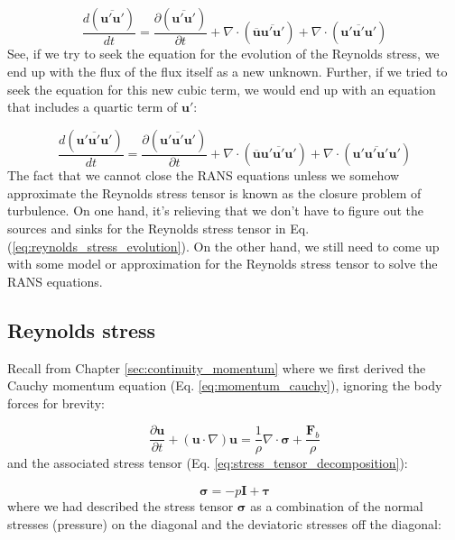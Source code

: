 \documentclass[12pt]{article}
\numberwithin{equation}{section}
\numberwithin{figure}{section}
\numberwithin{table}{section}
\begin{document}
\begin{equation}
  \frac{d \left( \overline{\mathbf{u}' \mathbf{u}'} \right)}{dt} =
  \frac{\partial \left( \overline{\mathbf{u}' \mathbf{u}'} \right)}{\partial t} +
  \nabla \cdot \left( \overline{\mathbf{u}} \overline{\mathbf{u}' \mathbf{u}'} \right) +
  \nabla \cdot \left( \overline{\mathbf{u}' \mathbf{u}' \mathbf{u}'} \right)
\end{equation}
See, if we try to seek the equation for the evolution of the Reynolds stress,
we end up with the flux of the flux itself as a new unknown.
Further, if we tried to seek the equation for this new cubic term, we would
end up with an equation that includes a quartic term of $\mathbf{u}'$:


\begin{equation}
  \frac{d \left( \overline{\mathbf{u}' \mathbf{u}' \mathbf{u}'} \right)}{dt} =
  \frac{\partial \left( \overline{\mathbf{u}' \mathbf{u}' \mathbf{u}'} \right)}{\partial t} +
  \nabla \cdot \left( \overline{\mathbf{u}} \overline{\mathbf{u}' \mathbf{u}' \mathbf{u}'} \right) +
  \nabla \cdot \left( \overline{\mathbf{u}' \mathbf{u}' \mathbf{u}' \mathbf{u}'} \right)
\end{equation}
The fact that we cannot close the RANS equations unless we somehow approximate
the Reynolds stress tensor is known as the closure problem of turbulence.
On one hand, it's relieving that we don't have to figure out the sources and
sinks for the Reynolds stress tensor in Eq. (\ref{eq:reynolds_stress_evolution}).
On the other hand, we still need to come up with some model or approximation
for the Reynolds stress tensor to solve the RANS equations.

\subsection{Reynolds stress}

Recall from Chapter \ref{sec:continuity_momentum} where we first derived the
Cauchy momentum equation (Eq. \ref{eq:momentum_cauchy}), ignoring the body forces
for brevity:

\begin{equation}
  \frac{\partial \mathbf{u}}{\partial t} + (\mathbf{u} \cdot \nabla) \mathbf{u} =
  \frac{1}{\rho} \nabla \cdot \boldsymbol{\sigma} + \frac{\mathbf{F}_b}{\rho}
\end{equation}
and the associated stress tensor (Eq. \ref{eq:stress_tensor_decomposition}):

\begin{equation}
  \boldsymbol{\sigma} = -p \mathbf{I} + \boldsymbol{\tau}
\end{equation}
where we had described the stress tensor $\boldsymbol{\sigma}$ as a combination
of the normal stresses (pressure) on the diagonal and the deviatoric stresses
off the diagonal:
\end{document}
